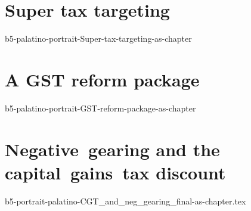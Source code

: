 \documentclass[twoside,english]{palatinob5ona4portrait}
\begin{document}
\cleardoublepage\null
{}
\part{Super tax targeting}\label{part:SUPER}
{b5-palatino-portrait-Super-tax-targeting-as-chapter}

\cleardoublepage\null
{}
\part{A GST reform package}\label{part:GST}
{b5-palatino-portrait-GST-reform-package-as-chapter}

\cleardoublepage\null
{}
\part{Negative~gearing and the capital~gains~tax discount}
{b5-portrait-palatino-CGT_and_neg_gearing_final-as-chapter.tex}





\backmatter
\cleardoublepage
{}
\small
\listoffigures
\listoftables
\printfigurenotes
\cleardoublepage
\printtablenotes
\cleardoublepage

\printendnotes
{}
\printbibliography[title={Bibliography},heading=none]
\end{document}
